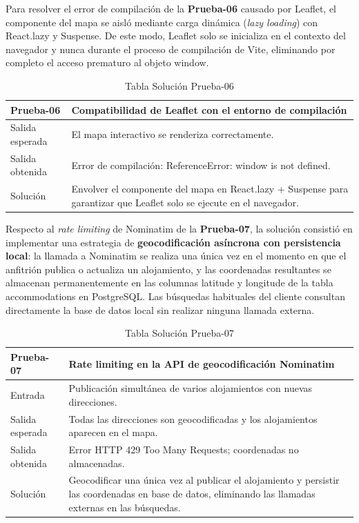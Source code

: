 Para resolver el error de compilación de la \textbf{Prueba-06} causado por Leaflet, el componente del mapa se aisló mediante carga dinámica (\emph{lazy loading}) con React.lazy y Suspense. De este modo, Leaflet solo se inicializa en el contexto del navegador y nunca durante el proceso de compilación de Vite, eliminando por completo el acceso prematuro al objeto window.

\begin{table}[H]
\centering
\begin{tabular}{|p{}|p{}|}
\hline
\textbf{Prueba-06} & \textbf{Compatibilidad de Leaflet con el entorno de compilación} \\ \hline
Salida esperada & El mapa interactivo se renderiza correctamente. \\ \hline
Salida obtenida & Error de compilación: ReferenceError: window is not defined. \\ \hline
Solución & Envolver el componente del mapa en React.lazy + Suspense para garantizar que Leaflet solo se ejecute en el navegador. \\ \hline
\end{tabular}
\caption{Tabla Solución Prueba-06}
\label{tab:sol_prueba06}
\end{table}

Respecto al \emph{rate limiting} de Nominatim de la \textbf{Prueba-07}, la solución consistió en implementar una estrategia de \textbf{geocodificación asíncrona con persistencia local}: la llamada a Nominatim se realiza una única vez en el momento en que el anfitrión publica o actualiza un alojamiento, y las coordenadas resultantes se almacenan permanentemente en las columnas latitude y longitude de la tabla accommodations en PostgreSQL. Las búsquedas habituales del cliente consultan directamente la base de datos local sin realizar ninguna llamada externa.

\begin{table}[H]
\centering
\begin{tabular}{|p{}|p{}|}
\hline
\textbf{Prueba-07} & \textbf{Rate limiting en la API de geocodificación Nominatim} \\ \hline
Entrada & Publicación simultánea de varios alojamientos con nuevas direcciones. \\ \hline
Salida esperada & Todas las direcciones son geocodificadas y los alojamientos aparecen en el mapa. \\ \hline
Salida obtenida & Error HTTP 429 Too Many Requests; coordenadas no almacenadas. \\ \hline
Solución & Geocodificar una única vez al publicar el alojamiento y persistir las coordenadas en base de datos, eliminando las llamadas externas en las búsquedas. \\ \hline
\end{tabular}
\caption{Tabla Solución Prueba-07}
\label{tab:sol_prueba07}
\end{table}

